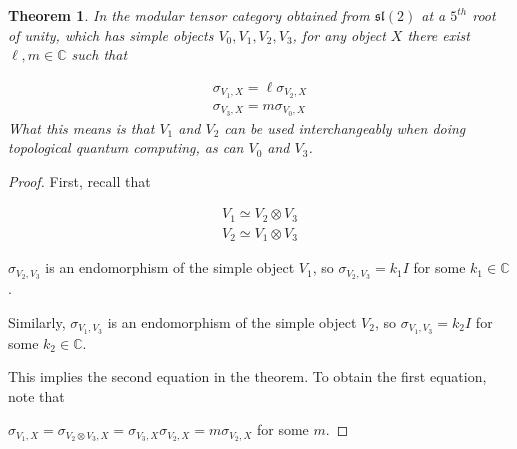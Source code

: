 \documentclass{article}
\newtheorem*{theorem}{Theorem}
\begin{document}
\begin{theorem}
    In the modular tensor category obtained from $\mathfrak{sl}(2)$ at a
    $5^{th}$ root of unity, which has simple objects $V_0, V_1, V_2, V_3$, for
    any object $X$ there exist $\ell, m \in \mathbb{C}$ such that 

\begin{align*}
    \sigma_{V_1,X} = \ell\sigma_{V_2,X} \\
    \sigma_{V_3,X} = m\sigma_{V_0,X} 
\end{align*}
    What this means is that $V_1$ and $V_2$ can be used interchangeably when
    doing topological quantum computing, as can $V_0$ and $V_3$. 


\end{theorem}
\begin{proof}
First, recall that 

\begin{align*}
V_1 \simeq V_2 \otimes V_3 \\
V_2 \simeq V_1 \otimes V_3
\end{align*}

$\sigma_{V_2,V_3}$ is an endomorphism of the simple object $V_1$, so
$\sigma_{V_2, V_3} = k_1I$ for some $k_1 \in \mathbb{C}$.

Similarly, $\sigma_{V_1,V_3}$ is an endomorphism of the simple object $V_2$, so
$\sigma_{V_1, V_3} = k_2I$ for some $k_2\in \mathbb{C}$. 

This implies the second equation in the theorem. To obtain the first equation, note that 


$\sigma_{V_1, X} = \sigma_{V_2 \otimes V_3, X} = \sigma_{V_3,X}\sigma_{V_2,X} = m\sigma_{V_2,X}$ for some $m$.

\end{proof}
\end{document}
